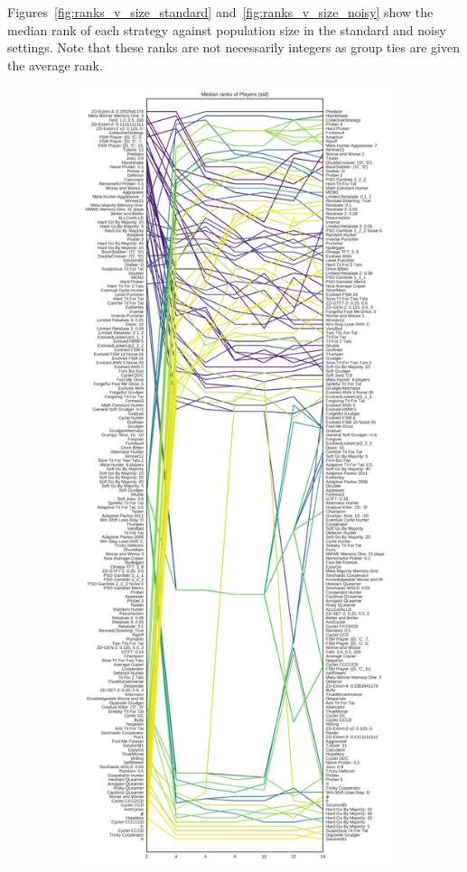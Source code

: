 \documentclass{article}
\begin{document}
Figures~\ref{fig:ranks_v_size_standard} and~\ref{fig:ranks_v_size_noisy} show
the median rank of each strategy against population size in the standard and
noisy settings. Note that these ranks are not necessarily integers as group ties
are given the average rank.

\begin{figure}[!hbtp]

    \centering
    \begin{subfigure}{.5\textwidth}
    \centering
    \includegraphics[height=.9\textheight]{../img/median_rank_vs_population_size_std.pdf}

\end{subfigure}
\end{figure}
\end{document}
